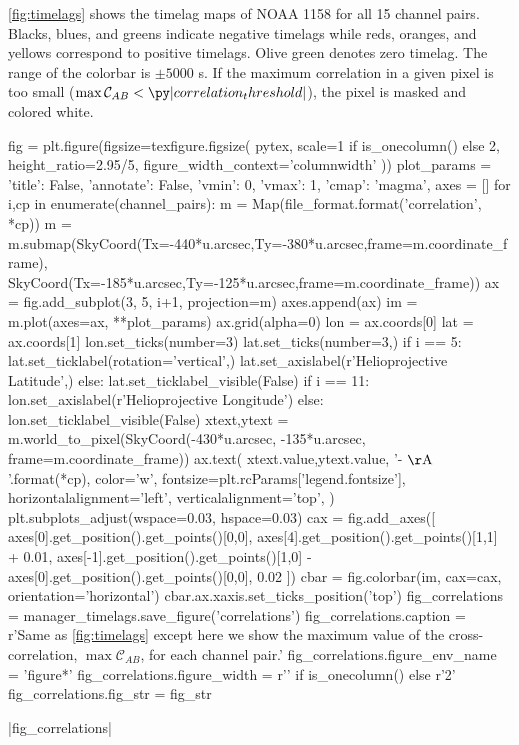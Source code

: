 \autoref{fig:timelags} shows the timelag maps of \AR{} NOAA 1158 for all 15 channel pairs. Blacks, blues, and greens indicate negative timelags while reds, oranges, and yellows correspond to positive timelags. Olive green denotes zero timelag. The range of the colorbar is $\pm5000$ s. If the maximum correlation in a given pixel is too small ($\max\mathcal{C}_{AB}<\py|correlation_threshold|$), the pixel is masked and colored white.

\begin{pycode}
fig = plt.figure(figsize=texfigure.figsize(
    pytex,
    scale=1 if is_onecolumn() else 2,
    height_ratio=2.95/5,
    figure_width_context='columnwidth'
))
plot_params = {
    'title': False, 
    'annotate': False,
    'vmin': 0,
    'vmax': 1,
    'cmap': 'magma',
}
axes = []
for i,cp in enumerate(channel_pairs):
    m = Map(file_format.format('correlation', *cp))
    m = m.submap(SkyCoord(Tx=-440*u.arcsec,Ty=-380*u.arcsec,frame=m.coordinate_frame),
                 SkyCoord(Tx=-185*u.arcsec,Ty=-125*u.arcsec,frame=m.coordinate_frame))
    ax = fig.add_subplot(3, 5, i+1, projection=m)
    axes.append(ax)
    im = m.plot(axes=ax, **plot_params)
    ax.grid(alpha=0)
    lon = ax.coords[0]
    lat = ax.coords[1]
    lon.set_ticks(number=3)
    lat.set_ticks(number=3,) 
    if i == 5:
        lat.set_ticklabel(rotation='vertical',)
        lat.set_axislabel(r'Helioprojective Latitude',)
    else:
        lat.set_ticklabel_visible(False)
    if i == 11:
        lon.set_axislabel(r'Helioprojective Longitude')
    else:
        lon.set_ticklabel_visible(False)
    xtext,ytext = m.world_to_pixel(SkyCoord(-430*u.arcsec, -135*u.arcsec, frame=m.coordinate_frame))
    ax.text(
        xtext.value,ytext.value,
        '{}-{} $\mathrm{{\AA}}$'.format(*cp),
        color='w',
        fontsize=plt.rcParams['legend.fontsize'],
        horizontalalignment='left',
        verticalalignment='top',
    )
plt.subplots_adjust(wspace=0.03, hspace=0.03)
cax = fig.add_axes([
    axes[0].get_position().get_points()[0,0],
    axes[4].get_position().get_points()[1,1] + 0.01,
    axes[-1].get_position().get_points()[1,0] - axes[0].get_position().get_points()[0,0], 
    0.02
])
cbar = fig.colorbar(im, cax=cax, orientation='horizontal')
cbar.ax.xaxis.set_ticks_position('top')
fig_correlations = manager_timelags.save_figure('correlations')
fig_correlations.caption = r'Same as \autoref{fig:timelags} except here we show the maximum value of the cross-correlation, $\max\mathcal{C}_{AB}$, for each channel pair.'
fig_correlations.figure_env_name = 'figure*'
fig_correlations.figure_width = r'\columnwidth' if is_onecolumn() else r'2\columnwidth'
fig_correlations.fig_str = fig_str
\end{pycode}
|fig_correlations|


